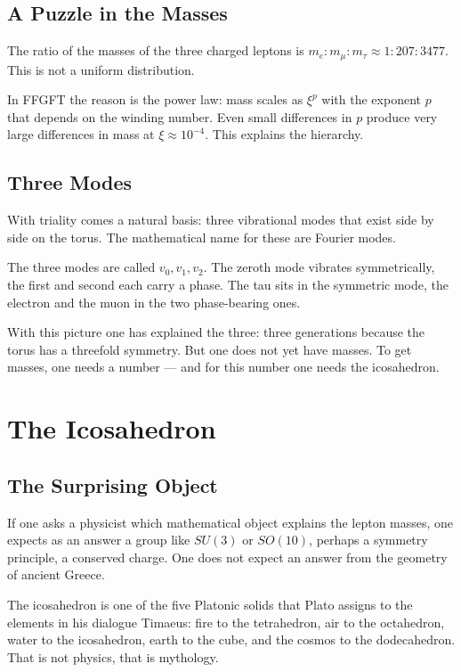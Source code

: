 \documentclass[12pt,oneside]{book}
\begin{document}
\section{A Puzzle in the Masses}

The ratio of the masses of the three charged leptons is $m_e : m_\mu : m_\tau \approx 1 : 207 : 3477$. This is not a uniform distribution.

In FFGFT the reason is the power law: mass scales as $\xi^p$ with the exponent $p$ that depends on the winding number. Even small differences in $p$ produce very large differences in mass at $\xi \approx 10^{-4}$. This explains the hierarchy.

\section{Three Modes}

With triality comes a natural basis: three vibrational modes that exist side by side on the torus. The mathematical name for these are Fourier modes.

The three modes are called $v_0, v_1, v_2$. The zeroth mode vibrates symmetrically, the first and second each carry a phase. The tau sits in the symmetric mode, the electron and the muon in the two phase-bearing ones.

With this picture one has explained the three: three generations because the torus has a threefold symmetry. But one does not yet have masses. To get masses, one needs a number --- and for this number one needs the icosa\-hedron.

\chapter{The Icosahedron}

\section{The Surprising Object}

If one asks a physicist which mathematical object explains the lepton masses, one expects as an answer a group like $SU(3)$ or $SO(10)$, perhaps a symmetry principle, a conserved charge. One does not expect an answer from the geometry of ancient Greece.

The icosa\-hedron is one of the five Platonic solids that Plato assigns to the elements in his dialogue Timaeus: fire to the tetrahedron, air to the octahedron, water to the icosa\-hedron, earth to the cube, and the cosmos to the dodecahedron. That is not physics, that is mythology.
\end{document}
